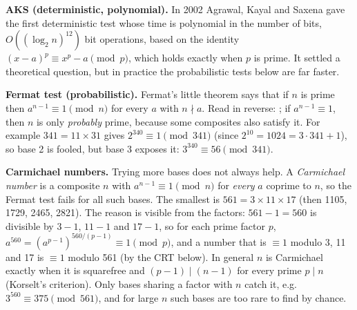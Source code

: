 \textbf{AKS (deterministic, polynomial).} In 2002 Agrawal, Kayal and Saxena gave the first deterministic test whose time is polynomial in the number of bits, $O((\log_2 n)^{12})$ bit operations, based on the identity $(x - a)^p \equiv x^p - a \pmod p$, which holds exactly when $p$ is prime. It settled a theoretical question, but in practice the probabilistic tests below are far faster.

\textbf{Fermat test (probabilistic).} Fermat's little theorem says that if $n$ is prime then $a^{n-1} \equiv 1 \pmod n$ for every $a$ with $n \nmid a$. Read in reverse: ; if $a^{n-1} \equiv 1$, then $n$ is only \emph{probably} prime, because some composites also satisfy it. For example $341 = 11 \times 31$ gives $2^{340} \equiv 1 \pmod{341}$ (since $2^{10} = 1024 = 3 \cdot 341 + 1$), so base 2 is fooled, but base 3 exposes it: $3^{340} \equiv 56 \pmod{341}$.

\textbf{Carmichael numbers.} Trying more bases does not always help. A \emph{Carmichael number} is a composite $n$ with $a^{n-1} \equiv 1 \pmod n$ for \emph{every} $a$ coprime to $n$, so the Fermat test fails for all such bases. The smallest is $561 = 3 \times 11 \times 17$ (then 1105, 1729, 2465, 2821). The reason is visible from the factors: $561 - 1 = 560$ is divisible by $3 - 1$, $11 - 1$ and $17 - 1$, so for each prime factor $p$, $a^{560} = (a^{p-1})^{560/(p-1)} \equiv 1 \pmod p$, and a number that is $\equiv 1$ modulo 3, 11 and 17 is $\equiv 1$ modulo 561 (by the CRT below). In general $n$ is Carmichael exactly when it is squarefree and $(p - 1) \mid (n - 1)$ for every prime $p \mid n$ (Korselt's criterion). Only bases sharing a factor with $n$ catch it, e.g.\ $3^{560} \equiv 375 \pmod{561}$, and for large $n$ such bases are too rare to find by chance.

